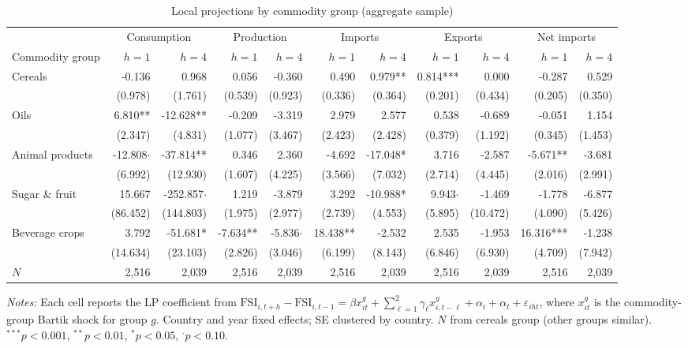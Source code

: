 
\begin{table}[htbp]
\centering
\caption{Local projections by commodity group (aggregate sample)}
\label{tab:group-lp-agg}
\begin{threeparttable}
\small
\begin{tabular}{l rr rr rr rr rr}
\toprule
 & \multicolumn{2}{c}{Consumption} & \multicolumn{2}{c}{Production} & \multicolumn{2}{c}{Imports} & \multicolumn{2}{c}{Exports} & \multicolumn{2}{c}{Net imports} \\
\cmidrule(lr){2-3} \cmidrule(lr){4-5} \cmidrule(lr){6-7} \cmidrule(lr){8-9} \cmidrule(lr){10-11}
Commodity group & $h=1$ & $h=4$ & $h=1$ & $h=4$ & $h=1$ & $h=4$ & $h=1$ & $h=4$ & $h=1$ & $h=4$ \\
\midrule
Cereals & -0.136 & 0.968 & 0.056 & -0.360 & 0.490 & 0.979** & 0.814*** & 0.000 & -0.287 & 0.529 \\
   & (0.978) & (1.761) & (0.539) & (0.923) & (0.336) & (0.364) & (0.201) & (0.434) & (0.205) & (0.350) \\[4pt]
Oils & 6.810** & -12.628** & -0.209 & -3.319 & 2.979 & 2.577 & 0.538 & -0.689 & -0.051 & 1.154 \\
   & (2.347) & (4.831) & (1.077) & (3.467) & (2.423) & (2.428) & (0.379) & (1.192) & (0.345) & (1.453) \\[4pt]
Animal products & -12.808$\cdot$ & -37.814** & 0.346 & 2.360 & -4.692 & -17.048* & 3.716 & -2.587 & -5.671** & -3.681 \\
   & (6.992) & (12.930) & (1.607) & (4.225) & (3.566) & (7.032) & (2.714) & (4.445) & (2.016) & (2.991) \\[4pt]
Sugar \& fruit & 15.667 & -252.857$\cdot$ & 1.219 & -3.879 & 3.292 & -10.988* & 9.943$\cdot$ & -1.469 & -1.778 & -6.877 \\
   & (86.452) & (144.803) & (1.975) & (2.977) & (2.739) & (4.553) & (5.895) & (10.472) & (4.090) & (5.426) \\[4pt]
Beverage crops & 3.792 & -51.681* & -7.634** & -5.836$\cdot$ & 18.438** & -2.532 & 2.535 & -1.953 & 16.316*** & -1.238 \\
   & (14.634) & (23.103) & (2.826) & (3.046) & (6.199) & (8.143) & (6.846) & (6.930) & (4.709) & (7.942) \\[4pt]
\midrule
$N$ & 2,516 & 2,039 & 2,516 & 2,039 & 2,516 & 2,039 & 2,516 & 2,039 & 2,516 & 2,039 \\
\bottomrule
\end{tabular}
\begin{tablenotes}\small
\item \textit{Notes:} Each cell reports the LP coefficient from $\text{FSI}_{i,t+h} - \text{FSI}_{i,t-1} = \beta x^g_{it} + \sum_{\ell=1}^{2}\gamma_\ell x^g_{i,t-\ell} + \alpha_i + \alpha_t + \varepsilon_{iht}$, where $x^g_{it}$ is the commodity-group Bartik shock for group $g$. Country and year fixed effects; SE clustered by country. $N$ from cereals group (other groups similar). $^{***}p<0.001$, $^{**}p<0.01$, $^{*}p<0.05$, $^{\cdot}p<0.10$.
\end{tablenotes}
\end{threeparttable}
\end{table}
